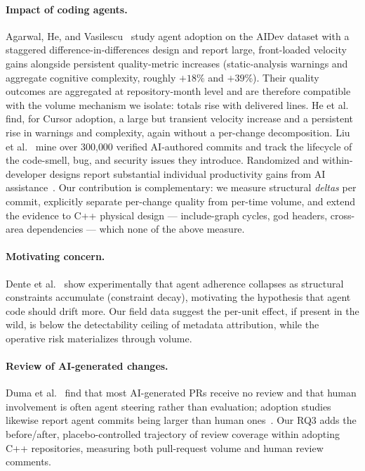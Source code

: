 \documentclass[sigplan,11pt,nonacm=true]{acmart}
\begin{document}
\paragraph{Impact of coding agents.} Agarwal, He, and
Vasilescu~\cite{agarwal2026} study agent adoption on the AIDev dataset with a
staggered difference-in-differences design and report large, front-loaded
velocity gains alongside persistent quality-metric increases (static-analysis
warnings and aggregate cognitive complexity, roughly $+18\%$ and $+39\%$).
Their quality outcomes are aggregated at repository-month level and are
therefore compatible with the volume mechanism we isolate: totals rise with
delivered lines. He et al.~\cite{he2026cursor} find, for Cursor adoption, a
large but transient velocity increase and a persistent rise in warnings and
complexity, again without a per-change decomposition. Liu et
al.~\cite{liu2026debt} mine over 300{,}000 verified AI-authored commits and
track the lifecycle of the code-smell, bug, and security issues they
introduce. Randomized and
within-developer designs report substantial individual productivity gains from
AI assistance~\cite{cui2024copilot}. Our contribution is complementary: we
measure structural \emph{deltas} per commit, explicitly separate per-change
quality from per-time volume, and extend the evidence to C++ physical design
--- include-graph cycles, god headers, cross-area dependencies --- which none
of the above measure.

\paragraph{Motivating concern.} Dente et al.~\cite{dente2026constraintdecay}
show experimentally that agent adherence collapses as structural constraints
accumulate (constraint decay), motivating the hypothesis that agent code
should drift more. Our field data suggest the per-unit effect, if present in
the wild, is below the detectability ceiling of metadata attribution, while
the operative risk materializes through volume.

\paragraph{Review of AI-generated changes.} Duma et
al.~\cite{duma2026reviews} find that most AI-generated PRs receive no review
and that human involvement is often agent steering rather than evaluation;
adoption studies likewise report agent commits being larger than human
ones~\cite{robbes2026agentic}. Our RQ3 adds the before/after,
placebo-controlled trajectory of review coverage within adopting C++
repositories, measuring both pull-request volume and human review comments.
\end{document}
